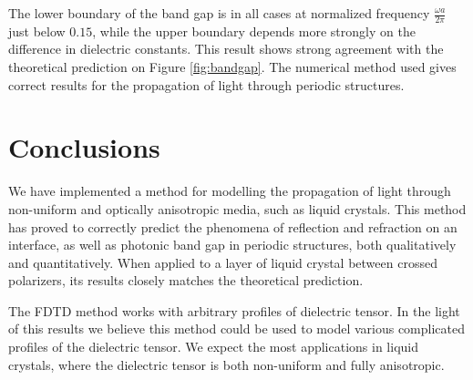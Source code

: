 \documentclass[a4paper,10pt]{article}
\renewenvironment{figure}
  {\par\medskip\noindent\minipage{\linewidth}}
  {\endminipage\par\medskip}
\begin{document}
\begin{multicols}{2}
\begin{figure}
 \centering
  \resizebox{\textwidth}{!}{}
  \label{fig:test-periodic}
\end{figure}

The lower boundary of the band gap is in all cases at normalized frequency $\frac{\omega a}{2\pi}$ just below $0.15$, while the upper boundary depends more strongly on the difference in dielectric constants. 
This result shows strong agreement with the theoretical prediction on Figure \ref{fig:bandgap}. 
The numerical method used gives correct results for the propagation of light through periodic structures. 

\section{Conclusions}
We have implemented a method for modelling the propagation of light through non-uniform and optically anisotropic media, such as liquid crystals. 
This method has proved to correctly predict the phenomena of reflection and refraction on an interface, as well as photonic band gap in periodic structures, both qualitatively and quantitatively.  
When applied to a layer of liquid crystal between crossed polarizers, its results closely matches the theoretical prediction. 

The \textsc{FDTD} method works with arbitrary profiles of dielectric tensor. 
In the light of this results we believe this method could be used to model various complicated profiles of the dielectric tensor. 
We expect the most applications in liquid crystals, where the dielectric tensor is both non-uniform and fully anisotropic. 




\end{multicols}
\end{document}
